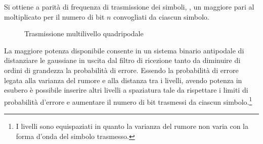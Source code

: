 Si ottiene a parità di frequenza di trasmissione dei simboli, , un maggiore  pari al  moltiplicato per il numero di bit $n$ convogliati da ciascun simbolo.

\begin{figure}[ht!]
\centering
{}
\caption{Trasmissione multilivello quadripodale}
\end{figure}

La maggiore potenza disponibile consente in un sistema binario antipodale di distanziare le gaussiane in uscita dal filtro di ricezione tanto da diminuire di ordini di grandezza la probabilità di errore. Essendo la probabilità di errore legata alla varianza del rumore e alla distanza tra i livelli, avendo potenza in esubero è possibile inserire altri livelli a spaziatura tale da rispettare i limiti di probabilità d'errore e aumentare il numero di bit trasmessi da ciascun simbolo.\footnote{I livelli sono equispaziati in quanto la varianza del rumore non varia con la forma d'onda del simbolo trasmesso.}

